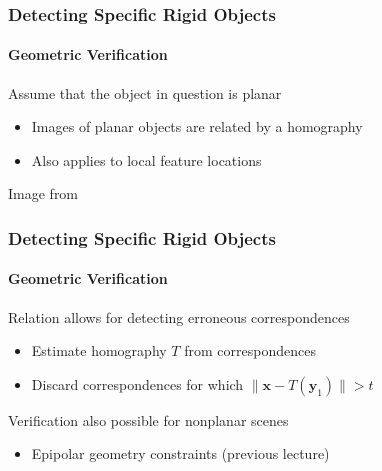 \documentclass[xetex,professionalfont]{beamer}
\renewcommand{\vec}[1]{\ensuremath{\mathbf{#1}}}
\newcommand{\vx}{\vec{x}}
\newcommand{\vy}{\vec{y}}
\begin{document}

\begin{frame}
\frametitle{Detecting Specific Rigid Objects}
\framesubtitle{Geometric Verification}

Assume that the object in question is planar
\begin{itemize}
    \item Images of planar objects are related by a homography %
    \item Also applies to local feature locations
\end{itemize}

\smallskip
\begin{center}
    {\centering Image from \cite{prince12}}
\end{center}

\end{frame}


\begin{frame}
\frametitle{Detecting Specific Rigid Objects}
\framesubtitle{Geometric Verification}

Relation allows for detecting erroneous correspondences
\begin{itemize}
    \item Estimate homography $T$ from correspondences %
    \item Discard correspondences for which $\lVert\vx-T(\vy_1)\rVert>t$ %
\end{itemize}

\bigskip
Verification also possible for nonplanar scenes
\begin{itemize}
    \item Epipolar geometry constraints (previous lecture) %
\end{itemize}

\end{frame}
\end{document}

